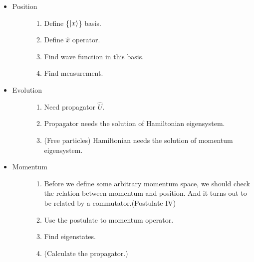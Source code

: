\documentclass[letterpaper,10pt,english]{sphinxmanual}
\begin{document}
\begin{itemize}
\item {} \begin{description}
\item[{Position}] \leavevmode\begin{enumerate}
\item {} 
Define \{$\ket{x}$\} basis.

\item {} 
Define $\hat x$ operator.

\item {} 
Find wave function in this basis.

\item {} 
Find measurement.

\end{enumerate}

\end{description}

\item {} \begin{description}
\item[{Evolution}] \leavevmode\begin{enumerate}
\item {} 
Need propagator $\hat U$.

\item {} 
Propagator needs the solution of Hamiltonian eigensystem.

\item {} 
(Free particles) Hamiltonian needs the solution of momentum eigensystem.

\end{enumerate}

\end{description}

\item {} \begin{description}
\item[{Momentum}] \leavevmode\begin{enumerate}
\item {} 
Before we define some arbitrary momentum space, we should check the relation between momentum and position. And it turns out to be related by a commutator.(Postulate IV)

\item {} 
Use the postulate to momentum operator.

\item {} 
Find eigenstates.

\item {} 
(Calculate the propagator.)

\end{enumerate}

\end{description}

\end{itemize}
\end{document}

